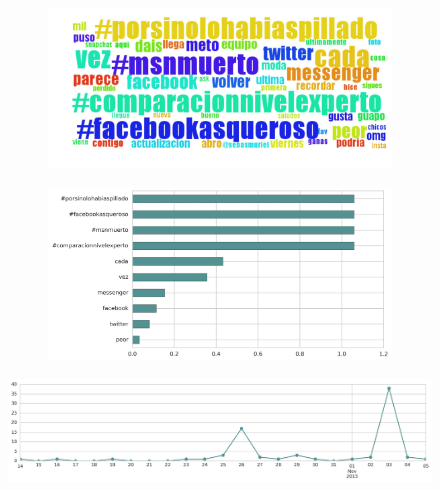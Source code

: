 \begin{figure}[htbp!]
    \centering
    \begin{subfigure}[b]{0.49\textwidth}
        \includegraphics[width=\textwidth]{twitter_all/report_images/topic-25-wordcloud.jpg}
    \end{subfigure}
    \begin{subfigure}[b]{0.49\textwidth}
        \includegraphics[width=\textwidth]{twitter_all/report_images/topic-25-terms.jpg}
    \end{subfigure}
\end{figure}

\begin{figure}[htbp!]
    \centering
    \includegraphics[width=\textwidth]{twitter_all/report_images/topic-25-timeseries.jpg}
\end{figure}

